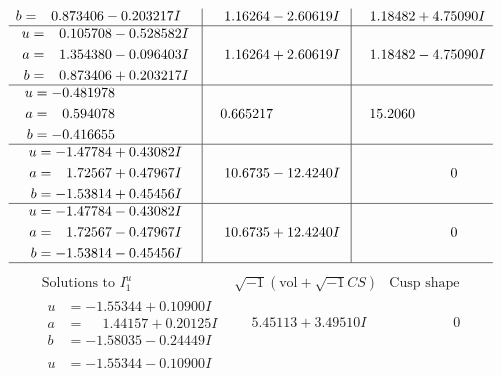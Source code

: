 \documentclass[1p]{elsarticle_modified}
\theoremstyle{definition}
\newcommand{\I}{\sqrt{-1}}
\begin{document}
$$\begin{array}{c|c|c}
\begin{aligned}
b &= \phantom{-}0.873406 - 0.203217 I\end{aligned}
 & \phantom{-}1.16264 - 2.60619 I & \phantom{-}1.18482 + 4.75090 I \\ \hline\begin{aligned}
u &= \phantom{-}0.105708 - 0.528582 I \\
a &= \phantom{-}1.354380 - 0.096403 I \\
b &= \phantom{-}0.873406 + 0.203217 I\end{aligned}
 & \phantom{-}1.16264 + 2.60619 I & \phantom{-}1.18482 - 4.75090 I \\ \hline\begin{aligned}
u &= -0.481978\phantom{ +0.000000I} \\
a &= \phantom{-}0.594078\phantom{ +0.000000I} \\
b &= -0.416655\phantom{ +0.000000I}\end{aligned}
 & \phantom{-}0.665217\phantom{ +0.000000I} & \phantom{-}15.2060\phantom{ +0.000000I} \\ \hline\begin{aligned}
u &= -1.47784 + 0.43082 I \\
a &= \phantom{-}1.72567 + 0.47967 I \\
b &= -1.53814 + 0.45456 I\end{aligned}
 & \phantom{-}10.6735 - 12.4240 I & \phantom{-0.000000 } 0 \\ \hline\begin{aligned}
u &= -1.47784 - 0.43082 I \\
a &= \phantom{-}1.72567 - 0.47967 I \\
b &= -1.53814 - 0.45456 I\end{aligned}
 & \phantom{-}10.6735 + 12.4240 I & \phantom{-0.000000 } 0\\
 \hline 
 \end{array}$$\newpage$$\begin{array}{c|c|c}  
\text{Solutions to }I^u_{1}& \I (\text{vol} + \sqrt{-1}CS) & \text{Cusp shape}\\
 \hline 
\begin{aligned}
u &= -1.55344 + 0.10900 I \\
a &= \phantom{-}1.44157 + 0.20125 I \\
b &= -1.58035 - 0.24449 I\end{aligned}
 & \phantom{-}5.45113 + 3.49510 I & \phantom{-0.000000 } 0 \\ \hline\begin{aligned}
u &= -1.55344 - 0.10900 I \\

\end{aligned}
\end{array}$$
\end{document}

